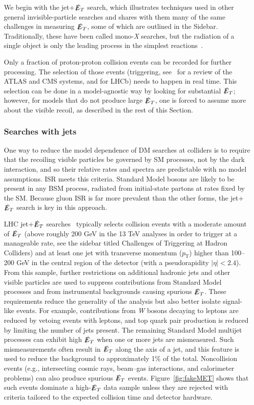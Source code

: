 \documentclass{ar-1col}
\newcommand{\pt}{\ensuremath{p_\mathrm{T}}\xspace}
\newcommand{\MET}{\ensuremath{\slashed{E}_T}\xspace}
\begin{document}
We begin with the jet+\MET search, which illustrates
techniques used in other general invisible-particle searches and
shares with them many of the same challenges in measuring \MET,
some of which are outlined in the Sidebar.
Traditionally, these
have been called mono-\textit{X} searches, but the radiation of a single
object is only the leading process in the simplest
reactions~\cite{Haisch:2013ata}.

Only a fraction of proton-proton collision events can be recorded for
further processing. The selection of those events (triggering, see~
for a review of the ATLAS and CMS systems, and \cite{Aaij:2012me} for LHCb)
needs to happen in real time. This selection can be done in a model-agnostic way by looking
for substantial \MET; however, for models that do not
produce large \MET, one is forced to assume more about the visible
recoil, as described in the rest of this Section. 

\subsubsection{Searches with jets}\label{sub:monojet}

One way to reduce the model dependence of DM searches at colliders is to
require that the recoiling visible particles be governed by SM
processes, not by the dark interaction, and so their relative rates and spectra are predictable
with no model assumptions. ISR meets this criteria.
Standard Model bosons are likely to be present in any BSM process, radiated
from initial-state partons at rates fixed by the SM. Because gluon
ISR is far more prevalent than the other forms, the jet+\MET
search is key in this approach.

LHC jet+\MET searches~\cite{Aaboud:2017phn,Sirunyan:2017jix}
typically selects collision events with a moderate amount of \MET
(above roughly 200 GeV in the 13 TeV analyses in order to trigger at a manageable rate,
see the sidebar titled Challenges of Triggering at Hadron Colliders)
and at least one jet with transverse momentum (\pt) higher than 100--200 GeV in the central
region of the detector (with a pseudorapidity $|\eta|<2.4$).
From this sample, further
restrictions on additional hadronic jets and other visible
particles are used to suppress contributions from Standard Model processes and
from instrumental backgrounds causing spurious \MET. These
requirements reduce the generality of the analysis but also better
isolate signal-like events. For example, contributions from \textit{W}
bosons decaying to leptons are reduced by vetoing events with
leptons, and top quark pair production is reduced by limiting the number
of jets present. The remaining Standard Model multijet processes can exhibit
high \MET when one or more jets are mismeasured. Such
mismeasurements often result in \MET along the axis of a jet, and
this feature is used to reduce the background to approximately 1\% of the
total. Noncollision events (e.g., intersecting cosmic rays,
beam--gas interactions, and calorimeter problems) can also produce
spurious \MET events. Figure~\ref{fig:fakeMET} shows that such
events dominate a high-\MET data sample unless they are rejected with
criteria tailored to the expected collision time and detector
hardware.
\end{document}
